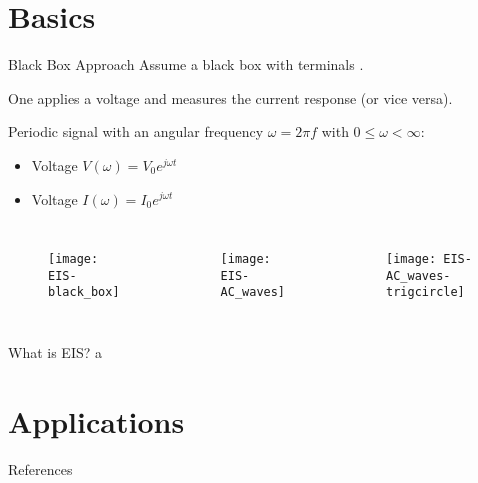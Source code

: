 \documentclass[10pt,compress,handout]{beamer}
\begin{document}
\section{Basics}
    \begin{frame}{Black Box Approach}
        Assume a black box with terminals .

        One applies a voltage and measures the current response (or vice versa).

        Periodic signal with an angular frequency $\omega = 2\pi f$
        with $0 \le \omega < \infty$:
        \begin{itemize}
            \item Voltage $V(\omega) = V_0 e^{j \omega t}$  
            \item Voltage $I(\omega) = I_0 e^{j \omega t}$  
        \end{itemize}
        
        \begin{columns}
            \centering
            \centering
                \begin{figure}[h]
                    \texttt{[image: EIS-black\_box]}
                \end{figure}
            \centering
                \begin{figure}
                    \texttt{[image: EIS-AC\_waves]}
                \end{figure}
            \centering
                \begin{figure}
                    \texttt{[image: EIS-AC\_waves-trigcircle]}
                \end{figure}
        \end{columns}
    \end{frame}
    
    \begin{frame}{What is EIS?}
    a
    \end{frame}


\section{Applications}

\begin{frame}[allowframebreaks=0.9]{References}
\AtNextBibliography{\tiny}
\printbibliography
\end{frame}
\end{document}
